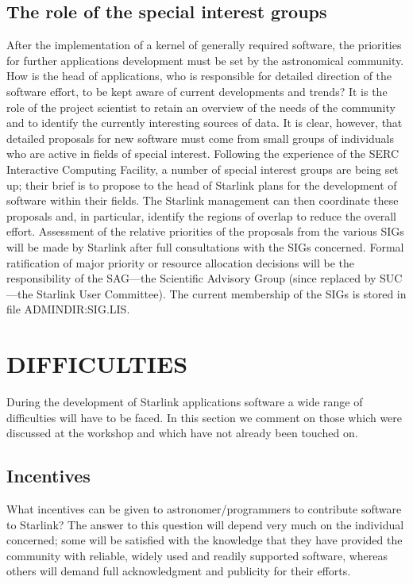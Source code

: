 \subsection {The role of the special interest groups}
After the implementation of a kernel of generally required software, the
priorities for further applications development must be set by the astronomical
community.
How is the head of applications, who is responsible for detailed direction of
the software effort, to be kept aware of current developments and trends?
It is the role of the project scientist to retain an overview of the needs of
the community and to identify the currently interesting sources of data.
It is clear, however, that detailed proposals for new software must come from
small groups of individuals who are active in fields of special interest.
Following the experience of the SERC Interactive Computing Facility, a number of
special interest groups are being set up; their brief is to propose to the
head of Starlink plans for the development of software within their fields.
The Starlink management can then coordinate these proposals and, in particular,
identify the regions of overlap to reduce the overall effort.
Assessment of the relative priorities of the proposals from the various
SIGs will be made by Starlink after full consultations with the SIGs concerned.
Formal ratification of major priority or resource allocation decisions will be
the responsibility of the SAG---the Scientific Advisory Group (since replaced
by SUC---the Starlink User Committee).
The current membership of the SIGs is stored in file ADMINDIR:SIG.LIS.
\section {DIFFICULTIES}
During the development of Starlink applications software a wide range of
difficulties will have to be faced.
In this section we comment on those which were discussed at the workshop and
which have not already been touched on.
\subsection {Incentives}
What incentives can be given to astronomer/programmers to contribute software to
Starlink?
The answer to this question will depend very much on the individual concerned;
some will be satisfied with the knowledge that they have provided the community
with reliable, widely used and readily supported software, whereas others will
demand full acknowledgment and publicity for their efforts.  

